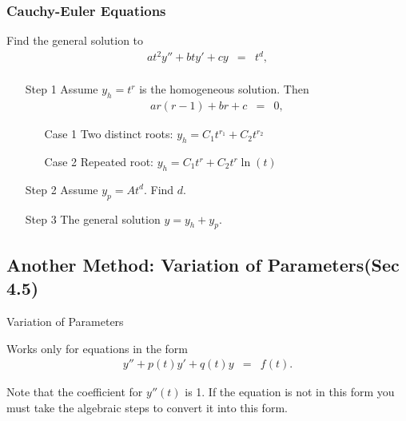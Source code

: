 \begin{frame}
  \frametitle{Cauchy-Euler Equations}

  Find the general solution to
  {\color{red}\begin{eqnarray*}
    a t^2 y''+ bt y' + c y  & = & t^d, \\
  \end{eqnarray*}}

  \begin{enumerate}
    \item[Step 1] Assume {\color{blue}$y_h=t^r$} is the homogeneous solution. Then
    \begin{eqnarray*}
      ar(r-1) +br + c & = & 0,
    \end{eqnarray*}
    \vspace{-0.5cm}
    \begin{enumerate}
    \item[Case 1] Two distinct roots:
           {\color{orange}$y_h=C_1t^{r_1}+C_2t^{r_2}$}
    \item[Case 2] Repeated root:
            {\color{orange}$y_h=C_1t^{r}+C_2t^{r}\ln(t)$ }
    \end{enumerate}

    \item[Step 2] Assume {\color{blue}$y_p=At^d$}. Find $d$.
    \item[Step 3] The general solution {\color{red}$y=y_h+y_p$}.
   \end{enumerate}



\end{frame}


\subsection{Another Method: Variation of Parameters(Sec 4.5)}

\begin{frame}{Variation of Parameters}

  Works only for equations in the form
  \begin{eqnarray}\label{eqn1}
    y'' + p(t) y' + q(t) y & = & f(t).
  \end{eqnarray}

  Note that the coefficient for $y''(t)$ is 1. If the equation is not
  in this form you must take the algebraic steps to convert it into
  this form.

\end{frame}

